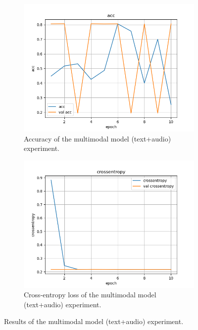 \documentclass[a4paper]{article}
\begin{document}
\begin{figure}[h]
    \centering
    \begin{subfigure}{0.45\textwidth}
        \includegraphics[width=\textwidth]{../logs/multi_3/acc.png}
        \caption{Accuracy of the multimodal model (text+audio) experiment.}
        \label{fig:multi_1_acc}
    \end{subfigure}
    \hfill
    \begin{subfigure}{0.45\textwidth}
        \includegraphics[width=\textwidth]{../logs/multi_3/crossentropy.png}
        \caption{Cross-entropy loss of the multimodal model (text+audio) experiment.}
        \label{fig:multi_1_loss}
    \end{subfigure}
    \caption{Results of the multimodal model (text+audio) experiment.}
    \label{fig:multi_1_results}
\end{figure}
\end{document}

